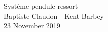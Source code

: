\documentclass[a4paper, 11pt]{article}
\begin{document}
\begin{titlepage}\centering
\vspace*{\fill}
\LARGE Système pendule-ressort \\
\vspace*{3mm}
\small Baptiste Claudon - Kent Barbey \\
\vspace*{3mm}
23 November 2019
\vspace*{\fill}
\end{titlepage}
\newpage
\tableofcontents
\newpage
\listoffigures
\newpage

\newpage

\newpage

\newpage

\newpage


\end{document}
